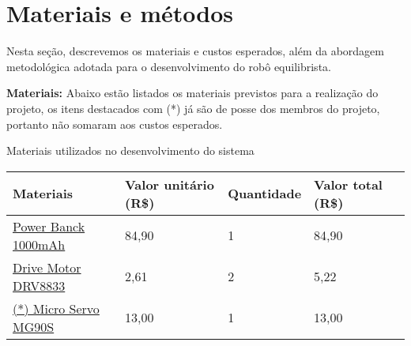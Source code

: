 \section{\textbf{Materiais e métodos}}
Nesta seção, descrevemos os materiais e custos esperados, além da abordagem metodológica adotada para o desenvolvimento do robô equilibrista.

\textbf{Materiais:} Abaixo estão listados os materiais previstos para a realização do projeto, os itens destacados com (*) já são de posse dos membros do projeto, portanto não somaram aos custos esperados. 

\begin{tabframed}[h]%
   \caption{Materiais utilizados no desenvolvimento do sistema}%
   \label{quad:exemplo1}%
   \renewcommand{\arraystretch}{1.5}
   \begin{tabular}{|l|l|l|l|l}
   \textbf{Materiais} & \textbf{Valor unitário (R\$)} & \textbf{Quantidade} & \textbf{Valor total (R\$)} \\ 
    
      \hline
      \href{https://produto.mercadolivre.com.br/MLB-2004934384-lip0-3s-111-v-1500-mah-3s-_JM?matt_tool=68334988&matt_word=&matt_source=google&matt_campaign_id=14300471977&matt_ad_group_id=127503848075&matt_match_type=&matt_network=g&matt_device=c&matt_creative=542969655996&matt_keyword=&matt_ad_position=&matt_ad_type=pla&matt_merchant_id=542516090&matt_product_id=MLB2004934384&matt_product_partition_id=1801247246545&matt_target_id=pla-1801247246545}{Power Banck 1000mAh} & 84,90 & 1 & 84,90 \\

      \hline 
      \href{https://www.aliexpress.com/item/32223093678.html?srcSns=sns_Copy&spreadType=socialShare&bizType=ProductDetail&social_params=21099436311&aff_fcid=c234ac5e17824f20a319f9cc17dbaf2f-1692194363304-03902-_mPjn7Ro&tt=MG&aff_fsk=_mPjn7Ro&aff_platform=default&sk=_mPjn7Ro&aff_trace_key=c234ac5e17824f20a319f9cc17dbaf2f-1692194363304-03902-_mPjn7Ro&shareId=21099436311&businessType=ProductDetail&platform=AE&terminal_id=676ed690bcd2403d8bbab55c9f2e36b3&afSmartRedirect=y}{Drive Motor DRV8833} & 2,61 & 2 &	5,22 \\
   
      \hline 
      \href{https://shopee.com.br/product/534679327/14372089266}{(*) Micro Servo MG90S}	& 13,00 & 1 & 13,00 \\


\end{tabular}
\end{tabframed}
